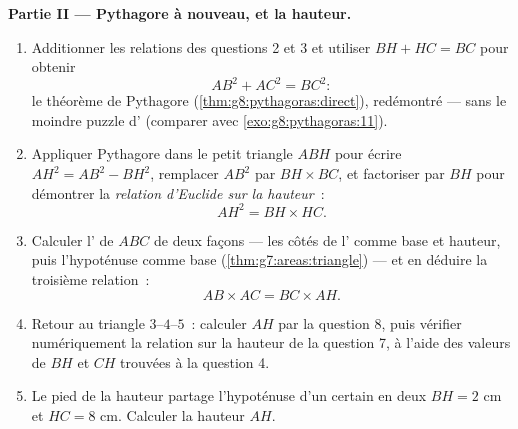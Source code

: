 \begin{problem}[{Devoir maison --- la hauteur d'un triangle
rectangle~: $AB^2 = BH \times BC$, $AH^2 = BH \times HC$, une seconde
démonstration de Pythagore, et une machine à construire des racines
carrées}]
\medskip
\noindent\textbf{Partie II --- Pythagore à nouveau, et la hauteur.}
\begin{enumerate}[resume]
  \item Additionner les relations des questions 2 et 3 et utiliser
        $BH + HC = BC$ pour obtenir
        \[
        AB^2 + AC^2 = BC^2 :
        \]
        le théorème de Pythagore (\cref{thm:g8:pythagoras:direct}),
        redémontré --- sans le moindre puzzle d' (comparer avec
        \cref{exo:g8:pythagoras:11}).
  \item Appliquer Pythagore dans le petit triangle $ABH$ pour
        écrire $AH^2 = AB^2 - BH^2$, remplacer $AB^2$ par
        $BH \times BC$, et factoriser par $BH$ pour démontrer la
        \emph{relation d'Euclide sur la hauteur}~:
        \[
        AH^2 = BH \times HC .
        \]
  \item Calculer l' de $ABC$ de deux façons --- les côtés de
        l' comme base et hauteur, puis l'hypoténuse comme
        base (\cref{thm:g7:areas:triangle}) --- et en déduire la
        troisième relation~:
        \[
        AB \times AC = BC \times AH .
        \]
  \item Retour au triangle $3$--$4$--$5$~: calculer $AH$ par la
        question 8, puis vérifier numériquement la relation sur la
        hauteur de la question 7, à l'aide des valeurs de $BH$ et
        $CH$ trouvées à la question 4.
  \item Le pied de la hauteur partage l'hypoténuse d'un certain
         en deux  $BH = 2$ cm et
        $HC = 8$ cm. Calculer la hauteur $AH$.
\end{enumerate}


\end{problem}
